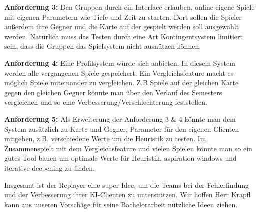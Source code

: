 \documentclass[12pt,a4paper,bibliography=totocnumbered,listof=totocnumbered]{scrartcl}
\begin{document}
	\textbf{Anforderung 3:} Den Gruppen durch ein Interface erlauben, online eigene Spiele mit eigenen Parametern wie Tiefe und Zeit zu starten. Dort sollen die Spieler außerdem ihre Gegner und die Karte auf der gespielt werden soll ausgewählt werden. Natürlich muss das Testen durch eine Art Kontingentsystem limitiert sein, dass die Gruppen das Spielsystem nicht ausnützen können. 
	
	\textbf{Anforderung 4:} Eine Profilsystem würde sich anbieten. In diesem System werden alle vergangenen Spiele gespeichert. Ein Vergleichsfeature macht es möglich Spiele miteinander zu vergleichen. Z.B Spiele auf der gleichen Karte gegen den gleichen Gegner könnte man über den Verlauf des Semesters vergleichen und so eine Verbesserung/Verschlechterung feststellen.
	
	\textbf{Anforderung 5:} Als Erweiterung der Anforderung 3 \& 4 könnte man dem System zusätzlich zu Karte und Gegner, Parameter für den eigenen Clienten mitgeben, z.B. verschiedene Werte um die Heuristik zu testen. Im Zusammenspielt mit dem Vergleichsfeature und vielen Spielen könnte man so ein gutes Tool bauen um optimale Werte für Heuristik, aspiration windows und iterative deepening zu finden.
	
	Insgesamt ist der Replayer eine super Idee, um die Teams bei der Fehlerfindung und der Verbesserung ihrer KI-Clienten zu unterstützen. Wir hoffen Herr Krapfl kann aus unseren Vorschäge für seine Bachelorarbeit nützliche Ideen ziehen.
	
    \newpage
\end{document}

